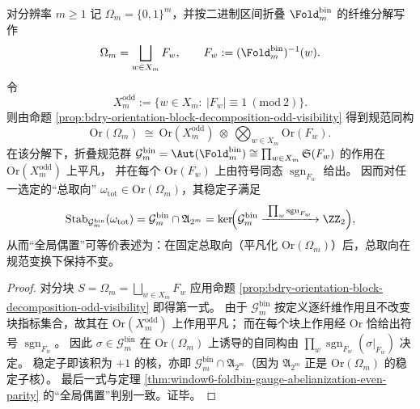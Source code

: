 \begin{corollary}\label{cor:window6-foldbin-global-even-parity-orientation-torsor}
对分辨率 \(m\ge 1\) 记 \(\Omega_m=\{0,1\}^m\)，并按二进制区间折叠 \(\Fold^{\mathrm{bin}}_m\) 的纤维分解写作
\[
\Omega_m=\bigsqcup_{w\in X_m}F_w,
\qquad
F_w:=(\Fold^{\mathrm{bin}}_m)^{-1}(w).
\]
令
\[
X_m^{\mathrm{odd}}:=\{w\in X_m:\ |F_w|\equiv 1\ (\mathrm{mod}\ 2)\}.
\]
则由命题 \ref{prop:bdry-orientation-block-decomposition-odd-visibility} 得到规范同构
\[
\mathrm{Or}(\Omega_m)\ \cong\ \mathrm{Or}(X_m^{\mathrm{odd}})\ \otimes\ \bigotimes_{w\in X_m}\mathrm{Or}(F_w).
\]
在该分解下，折叠规范群 \(\mathcal{G}^{\mathrm{bin}}_m=\Aut(\Fold^{\mathrm{bin}}_m)\cong \prod_{w\in X_m}\mathfrak S(F_w)\) 的作用在 \(\mathrm{Or}(X_m^{\mathrm{odd}})\) 上平凡，
并在每个 \(\mathrm{Or}(F_w)\) 上由符号同态 \(\operatorname{sgn}_{F_w}\) 给出。
因而对任一选定的“总取向” \(\omega_{\mathrm{tot}}\in \mathrm{Or}(\Omega_m)\)，其稳定子满足
\[
\mathrm{Stab}_{\mathcal{G}^{\mathrm{bin}}_m}(\omega_{\mathrm{tot}})
=\mathcal{G}^{\mathrm{bin}}_m\cap \mathfrak A_{2^m}
=\ker\!\Bigl(\mathcal{G}^{\mathrm{bin}}_m\xrightarrow{\ \prod_{w}\operatorname{sgn}_{F_w}\ }\ZZ_2\Bigr),
\]
从而“全局偶置”可等价表述为：在固定总取向（平凡化 \(\mathrm{Or}(\Omega_m)\)）后，总取向在规范变换下保持不变。
\end{corollary}
\begin{proof}
对分块 \(S=\Omega_m=\bigsqcup_{w\in X_m}F_w\) 应用命题 \ref{prop:bdry-orientation-block-decomposition-odd-visibility} 即得第一式。
由于 \(\mathcal{G}^{\mathrm{bin}}_m\) 按定义逐纤维作用且不改变块指标集合，故其在 \(\mathrm{Or}(X_m^{\mathrm{odd}})\) 上作用平凡；
而在每个块上作用经 \(\mathrm{Or}\) 恰给出符号 \(\operatorname{sgn}_{F_w}\)。
因此 \(\sigma\in\mathcal{G}^{\mathrm{bin}}_m\) 在 \(\mathrm{Or}(\Omega_m)\) 上诱导的自同构由 \(\prod_w\operatorname{sgn}_{F_w}(\sigma|_{F_w})\) 决定。
稳定子即该积为 \(+1\) 的核，亦即 \(\mathcal{G}^{\mathrm{bin}}_m\cap\mathfrak A_{2^m}\)（因为 \(\mathfrak A_{2^m}\) 正是 \(\mathrm{Or}(\Omega_m)\) 的稳定子核）。
最后一式与定理 \ref{thm:window6-foldbin-gauge-abelianization-even-parity} 的“全局偶置”判别一致。证毕。
\end{proof}

\endinput
